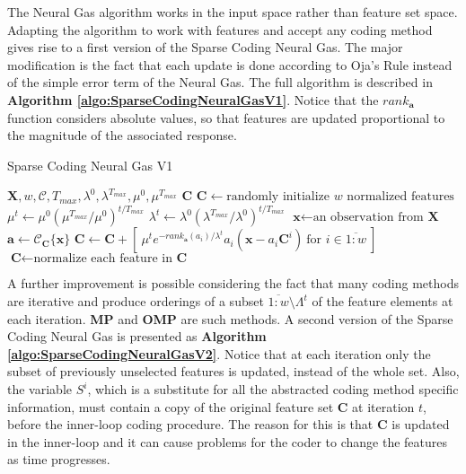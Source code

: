 \documentclass[12pt,a4paper,oneside,english]{UPBThesis}
\newcommand{\hcrange}[2]{\overline{{#1}\colon\!\!{#2}}}
\begin{document}
The Neural Gas algorithm works in the input space rather than feature set space. Adapting the algorithm to work with features and accept any coding method gives rise to a first version of the Sparse Coding Neural Gas. The major modification is the fact that each update is done according to Oja's Rule \cite{oja-rule} instead of the simple error term of the Neural Gas. The full algorithm is described in \textbf{Algorithm \ref{algo:SparseCodingNeuralGasV1}}. Notice that the $rank_{\textbf{a}}$ function considers absolute values, so that features are updated proportional to the magnitude of the associated response.

\begin{algorithm}
\caption{Sparse Coding Neural Gas V1}
\label{algo:SparseCodingNeuralGasV1}
\begin{algorithmic}
\Require $\textbf{X},w,\mathcal{C},T_{max},\lambda^0,\lambda^{T_{max}},\mu^0,\mu^{T_{max}}$
\Ensure $\textbf{C}$
\State $\textbf{C} \gets \mbox{randomly initialize $w$ normalized features}$
\For {$t = \hcrange{1}{T_{max}}$}
\State $\mu^t \gets \mu^0 (\mu^{T_{max}} / \mu^0)^{t / T_{max}}$  
\State $\lambda^t \gets \lambda^0 (\lambda^{T_{max}} / \lambda^0)^{t / T_{max}}$ 
\State $\textbf{x} \gets \text{an observation from $\textbf{X}$}$
\State $\textbf{a} \gets \mathcal{C}_{\textbf{C}}\{ \textbf{x} \}$
\State $\textbf{C} \gets \textbf{C} + [ ~ \mu^t e^{-rank_{\textbf{a}}(a_i) / \lambda^t} a_i (\textbf{x} - a_i \textbf{C}^i) ~ \mbox{for $i \in \hcrange{1}{w}$} ~ ]$
\State $\textbf{C} \gets \mbox{normalize each feature in $\textbf{C}$}$
\EndFor
\end{algorithmic}
\end{algorithm}

A further improvement is possible considering the fact that many coding methods are iterative and produce orderings of a subset $\hcrange{1}{w} \setminus \Lambda^t$ of the feature elements at each iteration. \textbf{MP} and \textbf{OMP} are such methods. A second version of the Sparse Coding Neural Gas is presented as \textbf{Algorithm \ref{algo:SparseCodingNeuralGasV2}}. Notice that at each iteration only the subset of previously unselected features is updated, instead of the whole set. Also, the variable $S^i$, which is a substitute for all the abstracted coding method specific information, must contain a copy of the original feature set $\textbf{C}$ at iteration $t$, before the inner-loop coding procedure. The reason for this is that $\textbf{C}$ is updated in the inner-loop and it can cause problems for the coder to change the features as time progresses.
\end{document}
